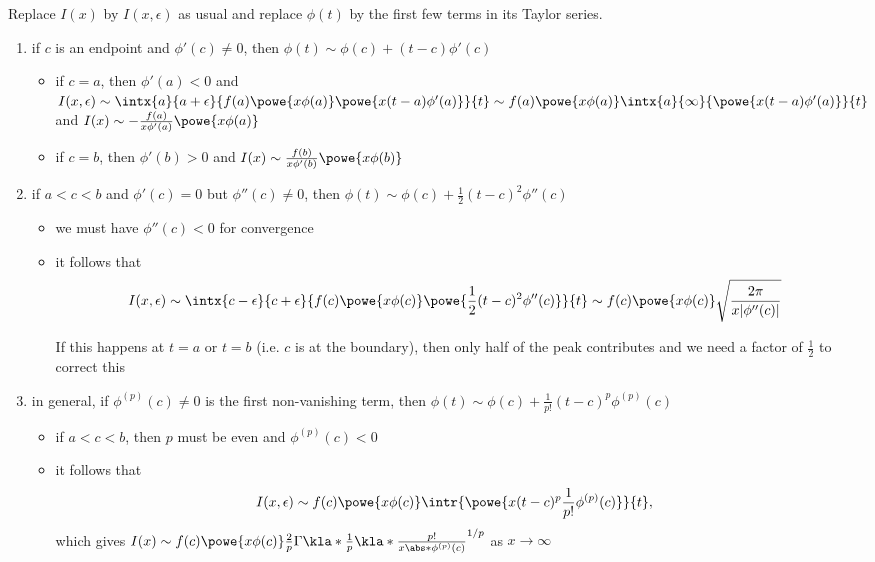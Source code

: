 \documentclass[english, parskip=full]{scrartcl}
\newcommand{\definition}[2]{\begin{tcolorbox}[colback=colorbackgrounddefinition,colframe=colordefinition, breakable,enhanced,title=\textbf{#1}.]#2\end{tcolorbox}}
\newcommand{\note}[1]{\begin{tcolorbox}[colback=colorbackgroundnote,colframe=colornote, breakable,enhanced]#1\end{tcolorbox}}
\begin{document}
\definition{Direct asymptotic behavior of $I(x)$}{Replace $I(x)$ by $I(x,\epsilon)$ as usual and replace $\phi(t)$ by the first few terms in its Taylor series.
\begin{enumerate}
\item if $c$ is an endpoint and $\phi'(c)\neq 0$, then $\phi(t) \sim \phi(c) + (t-c)\phi'(c)$
\begin{itemize}
\item if $c=a$, then $\phi'(a) < 0$ and $I(x,\epsilon) \sim \intx{a}{a+\epsilon}{f(a) \powe{x\phi(a)} \powe{x(t-a) \phi'(a)}}{t} \sim f(a) \powe{x\phi(a)} \intx{a}{\infty}{\powe{x(t-a)\phi'(a)}}{t}$ and $I(x) \sim -\frac{f(a)}{x\phi'(a)} \powe{x\phi(a)}$
\item if $c=b$, then $\phi'(b)>0$ and $I(x) \sim \frac{f(b)}{x\phi'(b)} \powe{x\phi(b)}$
\end{itemize}
\item if $a<c<b$ and $\phi'(c)=0$ but $\phi''(c)\neq 0$, then $\phi(t) \sim \phi(c) + \frac{1}{2} (t-c)^2 \phi''(c)$
\begin{itemize}
\item we must have $\phi''(c) < 0$ for convergence
\item it follows that \begin{align}
I(x,\epsilon) &\sim \intx{c-\epsilon}{c+\epsilon}{f(c) \powe{x\phi(c)} \powe{\frac{1}{2}(t-c)^2 \phi''(c)}}{t} \sim f(c) \powe{x\phi(c)} \sqrt{\frac{2\pi}{x|\phi''(c)|}}
\end{align}
\note{If this happens at $t=a$ or $t=b$ (i.e. $c$ is at the boundary), then only half of the peak contributes and we need a factor of $\frac{1}{2}$ to correct this}
\end{itemize}
\item in general, if $\phi^{(p)}(c) \neq 0$ is the first non-vanishing term, then $\phi(t) \sim \phi(c) + \frac{1}{p!} (t-c)^p \phi^{(p)}(c)$
\begin{itemize}
\item if $a<c<b$, then $p$ must be even and $\phi^{(p)}(c) < 0$
\item it follows that \begin{align}
I(x,\epsilon) &\sim f(c) \powe{x\phi(c)} \intr{\powe{x (t-c)^p \frac{1}{p!} \phi^{(p)}(c)}}{t},
\end{align}
which gives $I(x) \sim f(c) \powe{x\phi(c)} \frac{2}{p} \Gamma\kla*{\frac{1}{p}} \kla*{\frac{p!}{x\abs*{\phi^{(p)}(c)}}}^{1/p}$ as $x\rightarrow\infty$
\end{itemize}
\end{enumerate}
}
\end{document}
